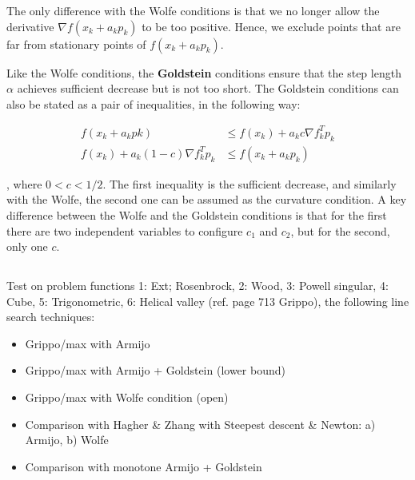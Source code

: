 \documentclass[a4paper,11pt]{article}
\numberwithin{equation}{section} %
\begin{document}
The only difference with the Wolfe conditions is that we no longer
allow the derivative $\nabla f(x_k + a_k  p_k)$ to be too positive. Hence, we exclude points that are far from stationary points of $f(x_k + a_k p_k)$.


Like the Wolfe conditions, the \textbf{Goldstein} conditions ensure that the step length $\alpha$
achieves sufficient decrease but is not too short. The Goldstein conditions can also be stated
as a pair of inequalities, in the following way:

\begin{align}
    f(x_k + a_k pk) &\leq f(x_k) + a_k c \nabla f_k^T p_k \\
    f(x_k) + a_k (1-c) \nabla f_k^T p_k & \le f(x_k + a_k p_k) 
\end{align}

, where $0 < c < 1/2$. The first inequality is the sufficient decrease, and similarly with the Wolfe, the second one can be assumed as the curvature condition. A key difference between the Wolfe and the Goldstein conditions is that for the first there are two independent variables to configure $c_1$ and $c_2$, but for the second, only one $c$.



\subsection{}


Test on problem functions 1: Ext; Rosenbrock, 2: Wood, 3: Powell singular, 4: Cube, 5: Trigonometric, 6: Helical valley (ref. page 713 Grippo), the following line search techniques:
    
\begin{itemize}
    \item Grippo/max with Armijo
    \item Grippo/max with Armijo + Goldstein (lower bound)
    \item Grippo/max with Wolfe condition (open)
    \item Comparison with Hagher \& Zhang with Steepest descent \& Newton: a) Armijo, b) Wolfe
    \item Comparison with monotone Armijo + Goldstein
\end{itemize}
\end{document}
